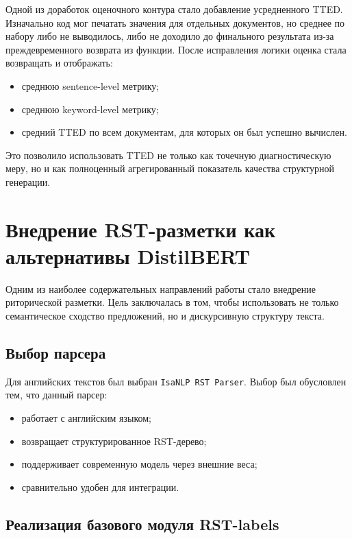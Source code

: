 \documentclass[12pt,a4paper]{article}
\begin{document}
Одной из доработок оценочного контура стало добавление усредненного TTED. Изначально код
мог печатать значения для отдельных документов, но среднее по набору либо не выводилось,
либо не доходило до финального результата из-за преждевременного возврата из функции.
После исправления логики оценка стала возвращать и отображать:

\begin{itemize}
    \item среднюю sentence-level метрику;
    \item среднюю keyword-level метрику;
    \item средний TTED по всем документам, для которых он был успешно вычислен.
\end{itemize}

Это позволило использовать TTED не только как точечную диагностическую меру, но и как
полноценный агрегированный показатель качества структурной генерации.

\section{Внедрение RST-разметки как альтернативы DistilBERT}

Одним из наиболее содержательных направлений работы стало внедрение риторической
разметки. Цель заключалась в том, чтобы использовать не только семантическое сходство
предложений, но и дискурсивную структуру текста.

\subsection{Выбор парсера}

Для английских текстов был выбран \texttt{IsaNLP RST Parser}. Выбор был обусловлен тем,
что данный парсер:

\begin{itemize}
    \item работает с английским языком;
    \item возвращает структурированное RST-дерево;
    \item поддерживает современную модель через внешние веса;
    \item сравнительно удобен для интеграции.
\end{itemize}

\subsection{Реализация базового модуля RST-labels}
\end{document}
